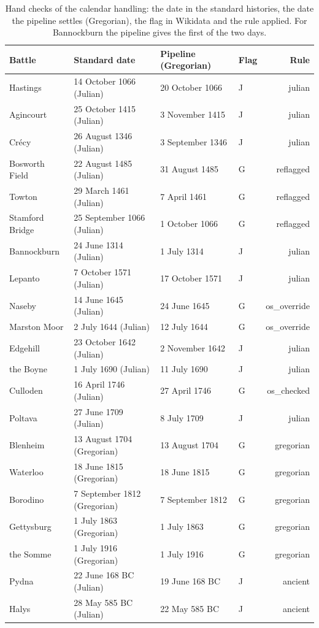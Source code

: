 \documentclass[11pt,a4paper]{article}
\begin{document}
\begin{table}[tbp]\centering\footnotesize\caption{Hand checks of the calendar handling: the date in the standard histories, the date the pipeline settles (Gregorian), the flag in Wikidata and the rule applied. For Bannockburn the pipeline gives the first of the two days.}\label{tab:cal}\begin{tabular}{llllr}\toprule Battle & Standard date & Pipeline (Gregorian) & Flag & Rule\\\midrule
Hastings & 14 October 1066 (Julian) & 20 October 1066 & J & julian\\
Agincourt & 25 October 1415 (Julian) & 3 November 1415 & J & julian\\
Crécy & 26 August 1346 (Julian) & 3 September 1346 & J & julian\\
Bosworth Field & 22 August 1485 (Julian) & 31 August 1485 & G & reflagged\\
Towton & 29 March 1461 (Julian) & 7 April 1461 & G & reflagged\\
Stamford Bridge & 25 September 1066 (Julian) & 1 October 1066 & G & reflagged\\
Bannockburn & 24 June 1314 (Julian) & 1 July 1314 & J & julian\\
Lepanto & 7 October 1571 (Julian) & 17 October 1571 & J & julian\\
Naseby & 14 June 1645 (Julian) & 24 June 1645 & G & os\_override\\
Marston Moor & 2 July 1644 (Julian) & 12 July 1644 & G & os\_override\\
Edgehill & 23 October 1642 (Julian) & 2 November 1642 & J & julian\\
the Boyne & 1 July 1690 (Julian) & 11 July 1690 & J & julian\\
Culloden & 16 April 1746 (Julian) & 27 April 1746 & G & os\_checked\\
Poltava & 27 June 1709 (Julian) & 8 July 1709 & J & julian\\
Blenheim & 13 August 1704 (Gregorian) & 13 August 1704 & G & gregorian\\
Waterloo & 18 June 1815 (Gregorian) & 18 June 1815 & G & gregorian\\
Borodino & 7 September 1812 (Gregorian) & 7 September 1812 & G & gregorian\\
Gettysburg & 1 July 1863 (Gregorian) & 1 July 1863 & G & gregorian\\
the Somme & 1 July 1916 (Gregorian) & 1 July 1916 & G & gregorian\\
Pydna & 22 June 168 BC (Julian) & 19 June 168 BC & J & ancient\\
Halys & 28 May 585 BC (Julian) & 22 May 585 BC & J & ancient\\
\bottomrule\end{tabular}\end{table}
\end{document}
